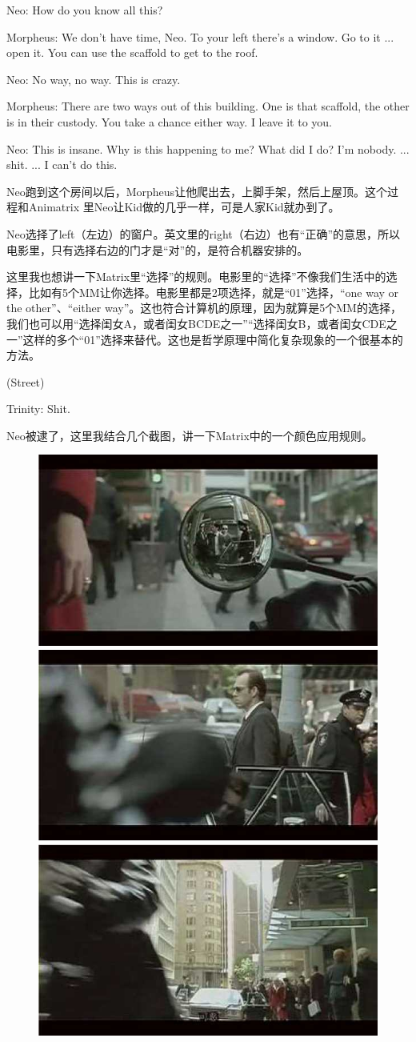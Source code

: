 \documentclass[UTF8]{ctexart}
\newenvironment{myquote}{\color{green} \setlength{\leftskip}{6em} \setlength{\rightskip}{4em} \setlength{\parindent}{-2em}}{\par}
\begin{document}
\begin{myquote}
Neo: How do you know all this?

Morpheus: We don't have time, Neo. To your left there's a window. Go to it ... open it. You can use the scaffold to get to the roof.

Neo: No way, no way. This is crazy.

Morpheus: There are two ways out of this building. One is that scaffold, the other is in their custody. You take a chance either way. I leave it to you.

Neo: This is insane. Why is this happening to me? What did I do? I'm nobody. ... shit. ... I can't do this.
\end{myquote}

Neo跑到这个房间以后，Morpheus让他爬出去，上脚手架，然后上屋顶。这个过程和Animatrix 里Neo让Kid做的几乎一样，可是人家Kid就办到了。

Neo选择了left（左边）的窗户。英文里的right（右边）也有“正确”的意思，所以电影里，只有选择右边的门才是“对”的，是符合机器安排的。

这里我也想讲一下Matrix里“选择”的规则。电影里的“选择”不像我们生活中的选择，比如有5个MM让你选择。电影里都是2项选择，就是“01”选择，“one way or the other”、“either way”。这也符合计算机的原理，因为就算是5个MM的选择，我们也可以用“选择闺女A，或者闺女BCDE之一”“选择闺女B，或者闺女CDE之一”这样的多个“01”选择来替代。这也是哲学原理中简化复杂现象的一个很基本的方法。

\begin{myquote}
(Street)

Trinity: Shit.
\end{myquote}

Neo被逮了，这里我结合几个截图，讲一下Matrix中的一个颜色应用规则。

\begin{figure}[htb]
\centering
\includegraphics[width=0.5\linewidth]{fig/read_Matrix-12}
\includegraphics[width=0.5\linewidth]{fig/read_Matrix-13}
\includegraphics[width=0.5\linewidth]{fig/read_Matrix-14}
\end{figure}
\end{document}
